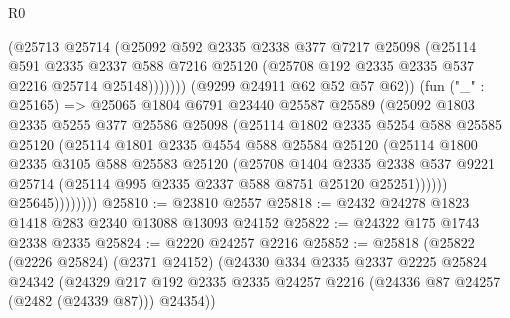 \begin{lexlean}{R0}
\begin{coremodule}
                          (@25713
                            @25714
                            (@25092
                              @592
                              @2335
                              @2338
                              @377
                              @7217
                              @25098
                              (@25114
                                @591
                                @2335
                                @2337
                                @588
                                @7216
                                @25120
                                (@25708 @192 @2335 @2335 @537 @2216 @25714 @25148)))))))
                    (@9299 @24911 @62 @52 @57 @62))
                  (fun ("_" : @25165) =>
                  @25065
                    @1804
                    @6791
                    @23440
                    @25587
                    @25589
                    (@25092
                      @1803
                      @2335
                      @5255
                      @377
                      @25586
                      @25098
                      (@25114
                        @1802
                        @2335
                        @5254
                        @588
                        @25585
                        @25120
                        (@25114
                          @1801
                          @2335
                          @4554
                          @588
                          @25584
                          @25120
                          (@25114
                            @1800
                            @2335
                            @3105
                            @588
                            @25583
                            @25120
                            (@25708
                              @1404
                              @2335
                              @2338
                              @537
                              @9221
                              @25714
                              (@25114 @995 @2335 @2337 @588 @8751 @25120 @25251))))))
                    @25645))))))))
@25810 := @23810 @2557
@25818 := @2432 @24278 @1823 @1418 @283 @2340 @13088 @13093 @24152
@25822 := @24322 @175 @1743 @2338 @2335
@25824 := @2220 @24257 @2216
@25852 := @25818
    (@25822
      (@2226 @25824)
      (@2371 @24152)
      (@24330
        @334
        @2335
        @2337
        @2225
        @25824
        @24342
        (@24329 @217 @192 @2335 @2335 @24257 @2216 (@24336 @87 @24257 (@2482 (@24339 @87))) @24354))

\end{coremodule}
\end{lexlean}
